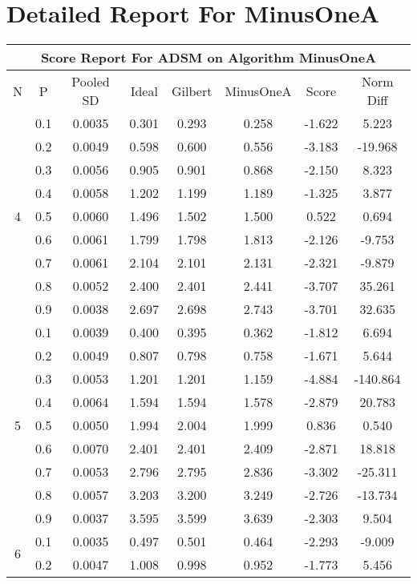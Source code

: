 \documentclass[11pt,a4paper]{report}
\begin{document}
\chapter{Detailed Report For MinusOneA}
\begin{longtable}{ | c | c || c | c | c | c | c | c | }
\hline
\multicolumn{8}{|c|}{ Score Report For ADSM on Algorithm MinusOneA} \\
\hline
N & P & Pooled SD &  Ideal &  Gilbert & MinusOneA  & Score & Norm Diff \\
 \hline
 \hline
 \endhead
\multirow{9}{*}{4} & 0.1 & 0.0035 & 0.301 & 0.293 & 0.258 & -1.622 & 5.223 \\
 & 0.2 & 0.0049 & 0.598 & 0.600 & 0.556 & -3.183 & -19.968 \\
 & 0.3 & 0.0056 & 0.905 & 0.901 & 0.868 & -2.150 & 8.323 \\
 & 0.4 & 0.0058 & 1.202 & 1.199 & 1.189 & -1.325 & 3.877 \\
 & 0.5 & 0.0060 & 1.496 & 1.502 & 1.500 & 0.522 & 0.694 \\
 & 0.6 & 0.0061 & 1.799 & 1.798 & 1.813 & -2.126 & -9.753 \\
 & 0.7 & 0.0061 & 2.104 & 2.101 & 2.131 & -2.321 & -9.879 \\
 & 0.8 & 0.0052 & 2.400 & 2.401 & 2.441 & -3.707 & 35.261 \\
 & 0.9 & 0.0038 & 2.697 & 2.698 & 2.743 & -3.701 & 32.635 \\
 \hline
\multirow{9}{*}{5} & 0.1 & 0.0039 & 0.400 & 0.395 & 0.362 & -1.812 & 6.694 \\
 & 0.2 & 0.0049 & 0.807 & 0.798 & 0.758 & -1.671 & 5.644 \\
 & 0.3 & 0.0053 & 1.201 & 1.201 & 1.159 & -4.884 & -140.864 \\
 & 0.4 & 0.0064 & 1.594 & 1.594 & 1.578 & -2.879 & 20.783 \\
 & 0.5 & 0.0050 & 1.994 & 2.004 & 1.999 & 0.836 & 0.540 \\
 & 0.6 & 0.0070 & 2.401 & 2.401 & 2.409 & -2.871 & 18.818 \\
 & 0.7 & 0.0053 & 2.796 & 2.795 & 2.836 & -3.302 & -25.311 \\
 & 0.8 & 0.0057 & 3.203 & 3.200 & 3.249 & -2.726 & -13.734 \\
 & 0.9 & 0.0037 & 3.595 & 3.599 & 3.639 & -2.303 & 9.504 \\
 \hline
\multirow{9}{*}{6} & 0.1 & 0.0035 & 0.497 & 0.501 & 0.464 & -2.293 & -9.009 \\
 & 0.2 & 0.0047 & 1.008 & 0.998 & 0.952 & -1.773 & 5.456 \\

\end{longtable}
\end{document}
